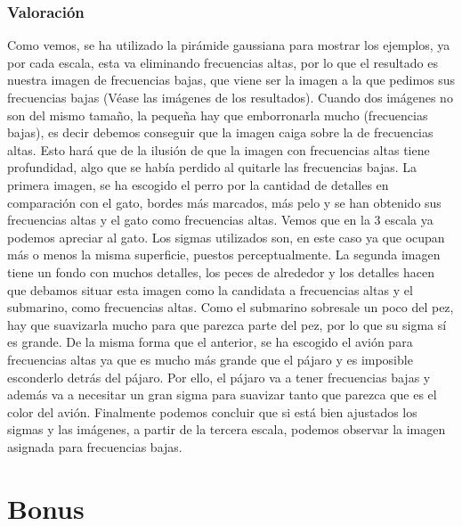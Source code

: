 \documentclass{article}
\begin{document}
\subsubsection{Valoración}
Como vemos, se ha utilizado la pirámide gaussiana para mostrar los ejemplos, ya por cada escala, esta va eliminando frecuencias altas, por lo que el resultado es nuestra imagen de frecuencias bajas, que viene ser la imagen a la que pedimos sus frecuencias bajas (Véase las imágenes de los resultados).
\newline
\newline
Cuando dos imágenes no son del mismo tamaño, la pequeña hay que emborronarla mucho (frecuencias bajas), es decir debemos conseguir que la imagen caiga sobre la de frecuencias altas. Esto hará que de la ilusión de que la imagen con frecuencias altas tiene profundidad, algo que se había perdido al quitarle las frecuencias bajas.
\newline
\newline
La primera imagen, se ha escogido el perro por la cantidad de detalles en comparación con el gato, bordes más marcados, más pelo y se han obtenido sus frecuencias altas y el gato como frecuencias altas. Vemos que en la 3 escala ya podemos apreciar al gato. Los sigmas utilizados son, en este caso ya que ocupan más o menos la misma superficie, puestos perceptualmente.
\newline
\newline
La segunda imagen tiene un fondo con muchos detalles, los peces de alrededor y los detalles hacen que debamos situar esta imagen como la candidata a frecuencias altas y el submarino, como frecuencias altas. Como el submarino sobresale un poco del pez, hay que suavizarla mucho para que parezca parte del pez, por lo que su sigma sí es grande.
\newline
\newline
De la misma forma que el anterior, se ha escogido el avión para frecuencias altas ya que es mucho más grande que el pájaro y es imposible esconderlo detrás del pájaro. Por ello, el pájaro va a tener frecuencias bajas y además va a necesitar un gran sigma para suavizar tanto que parezca que es el color del avión.
\newline
\newline
Finalmente podemos concluir que si está bien ajustados los sigmas y las imágenes, a partir de la tercera escala, podemos observar la imagen asignada para frecuencias bajas.

\newpage

\section{Bonus}
\end{document}
